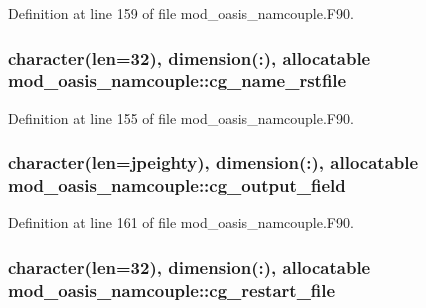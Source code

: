 Definition at line 159 of file mod\+\_\+oasis\+\_\+namcouple.\+F90.

\hypertarget{classmod__oasis__namcouple_ac79429a9522aabddbe4ed68fd9571bec}{
\subsubsection[{cg\+\_\+name\+\_\+rstfile}]{\setlength{\rightskip}{0pt plus 5cm}character(len=32), dimension(\+:), allocatable mod\+\_\+oasis\+\_\+namcouple\+::cg\+\_\+name\+\_\+rstfile\hspace{0.3cm}{\ttfamily [private]}}}\label{classmod__oasis__namcouple_ac79429a9522aabddbe4ed68fd9571bec}


Definition at line 155 of file mod\+\_\+oasis\+\_\+namcouple.\+F90.

\hypertarget{classmod__oasis__namcouple_a1b680bf476776f3db085dc1f0009736c}{
\subsubsection[{cg\+\_\+output\+\_\+field}]{\setlength{\rightskip}{0pt plus 5cm}character(len={\bf jpeighty}), dimension(\+:), allocatable mod\+\_\+oasis\+\_\+namcouple\+::cg\+\_\+output\+\_\+field\hspace{0.3cm}{\ttfamily [private]}}}\label{classmod__oasis__namcouple_a1b680bf476776f3db085dc1f0009736c}


Definition at line 161 of file mod\+\_\+oasis\+\_\+namcouple.\+F90.

\hypertarget{classmod__oasis__namcouple_a6eec7fe795bfb9c2058c7953c072d442}{
\subsubsection[{cg\+\_\+restart\+\_\+file}]{\setlength{\rightskip}{0pt plus 5cm}character(len=32), dimension(\+:), allocatable mod\+\_\+oasis\+\_\+namcouple\+::cg\+\_\+restart\+\_\+file\hspace{0.3cm}{\ttfamily [private]}}}\label{classmod__oasis__namcouple_a6eec7fe795bfb9c2058c7953c072d442}



